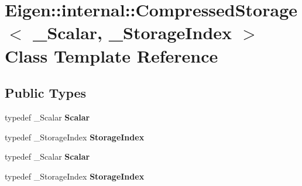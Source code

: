 \hypertarget{class_eigen_1_1internal_1_1_compressed_storage}{}\section{Eigen\+:\+:internal\+:\+:Compressed\+Storage$<$ \+\_\+\+Scalar, \+\_\+\+Storage\+Index $>$ Class Template Reference}
\label{class_eigen_1_1internal_1_1_compressed_storage}
\subsection*{Public Types}
\begin{DoxyCompactItemize}
\item 
\mbox{\label{class_eigen_1_1internal_1_1_compressed_storage_a6714e298df525bf3e02d175b08cd6cba}} 
typedef \+\_\+\+Scalar {\bfseries Scalar}
\item 
\mbox{\label{class_eigen_1_1internal_1_1_compressed_storage_ad2b97b9facd3f5d9735f0dfc062e31de}} 
typedef \+\_\+\+Storage\+Index {\bfseries Storage\+Index}
\item 
\mbox{\label{class_eigen_1_1internal_1_1_compressed_storage_a6714e298df525bf3e02d175b08cd6cba}} 
typedef \+\_\+\+Scalar {\bfseries Scalar}
\item 
\mbox{\label{class_eigen_1_1internal_1_1_compressed_storage_ad2b97b9facd3f5d9735f0dfc062e31de}} 
typedef \+\_\+\+Storage\+Index {\bfseries Storage\+Index}
\end{DoxyCompactItemize}
